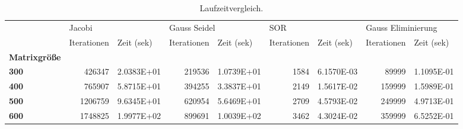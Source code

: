 \begin{table}[h!]
\centering
\caption{Laufzeitvergleich.}
\label{laufzeit}
\begin{tabular}{lrlrlrlrl}
\toprule
{} & \multicolumn{2}{l}{Jacobi} & \multicolumn{2}{l}{Gauss Seidel} & \multicolumn{2}{l}{SOR} & \multicolumn{2}{l}{Gauss Eliminierung} \\
{} & Iterationen &  Zeit (sek) &  Iterationen &  Zeit (sek) & Iterationen &  Zeit (sek) &        Iterationen &  Zeit (sek) \\
\textbf{Matrixgröße} &             &             &              &             &             &             &                    &             \\
\midrule
\textbf{300        } &      426347 &  2.0383E+01 &       219536 &  1.0739E+01 &        1584 &  6.1570E-03 &              89999 &  1.1095E-01 \\
\textbf{400        } &      765907 &  5.8715E+01 &       394255 &  3.3837E+01 &        2149 &  1.5617E-02 &             159999 &  1.5989E-01 \\
\textbf{500        } &     1206759 &  9.6345E+01 &       620954 &  5.6469E+01 &        2709 &  4.5793E-02 &             249999 &  4.9713E-01 \\
\textbf{600        } &     1748825 &  1.9977E+02 &       899691 &  1.0039E+02 &        3462 &  4.3024E-02 &             359999 &  6.5252E-01 \\
\bottomrule
\end{tabular}
\end{table}

